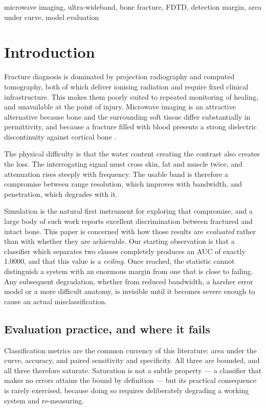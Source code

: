 \documentclass[conference]{IEEEtran}
\begin{document}
\begin{IEEEkeywords}
microwave imaging, ultra-wideband, bone fracture, FDTD, detection margin,
area under curve, model evaluation
\end{IEEEkeywords}

\section{Introduction}

Fracture diagnosis is dominated by projection radiography and computed
tomography, both of which deliver ionising radiation and require fixed
clinical infrastructure. This makes them poorly suited to repeated
monitoring of healing, and unavailable at the point of injury. Microwave
imaging is an attractive alternative because bone and the surrounding soft
tissue differ substantially in permittivity, and because a fracture filled
with blood presents a strong dielectric discontinuity against cortical bone
\cite{gabriel}.

The physical difficulty is that the water content creating the contrast also
creates the loss. The interrogating signal must cross skin, fat and muscle
twice, and attenuation rises steeply with frequency. The usable band is
therefore a compromise between range resolution, which improves with
bandwidth, and penetration, which degrades with it.

Simulation is the natural first instrument for exploring that compromise,
and a large body of such work reports excellent discrimination between
fractured and intact bone. This paper is concerned with how those results
are \emph{evaluated} rather than with whether they are achievable. Our
starting observation is that a classifier which separates two classes
completely produces an AUC of exactly 1.0000, and that this value is a
\emph{ceiling}. Once reached, the statistic cannot distinguish a system with
an enormous margin from one that is close to failing. Any subsequent
degradation, whether from reduced bandwidth, a harsher error model or a more
difficult anatomy, is invisible until it becomes severe enough to cause an
actual misclassification.

\subsection{Evaluation practice, and where it fails}

Classification metrics are the common currency of this literature: area
under the curve, accuracy, and paired sensitivity and specificity. All three
are bounded, and all three therefore saturate. Saturation is not a subtle
property --- a classifier that makes no errors attains the bound by
definition --- but its practical consequence is rarely exercised, because
doing so requires deliberately degrading a working system and re-measuring.
\end{document}
